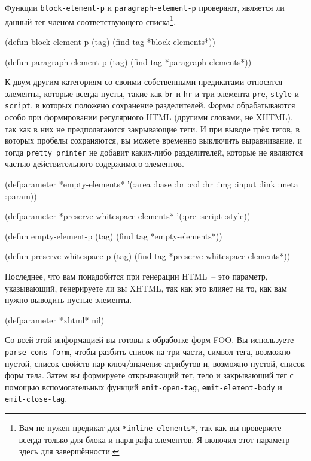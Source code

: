 Функции \lstinline{block-element-p} и \lstinline{paragraph-element-p} проверяют, является ли данный
тег членом соответствующего списка\footnote{Вам не нужен предикат для
  \lstinline{*inline-elements*}, так как вы проверяете всегда только для блока и параграфа
  элементов. Я включил этот параметр здесь для завершённости.}\hspace{\footnotenegspace}.

\begin{myverb}
(defun block-element-p (tag) (find tag *block-elements*))

(defun paragraph-element-p (tag) (find tag *paragraph-elements*))
\end{myverb}

К двум другим категориям со своими собственными предикатами относятся элементы, которые
всегда пусты, такие как \lstinline{br} и \lstinline{hr} и три элемента \lstinline{pre}, \lstinline{style} и
\lstinline{script}, в которых положено сохранение разделителей. Формы обрабатываются особо при
формировании регулярного HTML (другими словами, не XHTML), так как в них не предполагаются
закрывающие теги. И при выводе трёх тегов, в которых пробелы сохраняются, вы можете
временно выключить выравнивание, и тогда \lstinline{pretty printer} не добавит каких-либо
разделителей, которые не являются частью действительного содержимого элементов.

\begin{myverb}
(defparameter *empty-elements*
  '(:area :base :br :col :hr :img :input :link :meta :param))

(defparameter *preserve-whitespace-elements* '(:pre :script :style))

(defun empty-element-p (tag) (find tag *empty-elements*))

(defun preserve-whitespace-p (tag) (find tag *preserve-whitespace-elements*))
\end{myverb}

Последнее, что вам понадобится при генерации HTML~-- это параметр, указывающий, генерируете
ли вы XHTML, так как это влияет на то, как вам нужно выводить пустые элементы.

\begin{myverb}
(defparameter *xhtml* nil)
\end{myverb}

Со всей этой информацией вы готовы к обработке форм FOO. Вы используете
\lstinline{parse-cons-form}, чтобы разбить список на три части, символ тега, возможно пустой,
список свойств пар ключ/значение атрибутов и, возможно пустой, список форм тела. Затем вы
формируете открывающий тег, тело и закрывающий тег с помощью вспомогательных функций
\lstinline{emit-open-tag}, \lstinline{emit-element-body} и \lstinline{emit-close-tag}.

